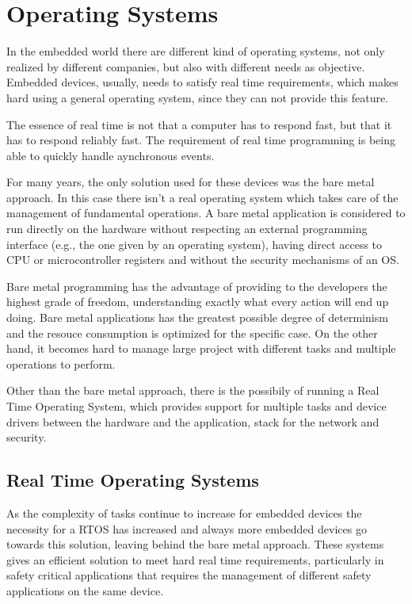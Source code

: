 \section{Operating Systems}

In the embedded world there are different kind of operating systems, not only
realized by different companies, but also with different needs as objective.
Embedded devices, usually, needs to satisfy real time requirements, which
makes hard using a general operating system, since they can not provide
this feature.

The essence of real time is not that a computer has to respond fast, but that
it has to respond reliably fast.
The requirement of real time programming is being able to quickly handle
aynchronous events. \cite{abbott2011linux} 

For many years, the only solution used for these devices was the bare metal
approach. In this case there isn't a real operating system which takes care
of the management of fundamental operations.
A bare metal application is considered to run directly on the hardware without
respecting an external programming interface 
(e.g., the one given by an operating system), having direct access to CPU
or microcontroller registers and without the security mechanisms of an OS.

Bare metal programming has the advantage of providing to the developers the
highest grade of freedom, understanding exactly what every action will end up
doing. Bare metal applications has the greatest possible degree of 
determinism and the resouce consumption is optimized for the specific case. 
On the other hand, it becomes hard to manage large project with different tasks
and multiple operations to perform.

Other than the bare metal approach, there is the possibily of running a Real
Time Operating System, which provides support for multiple tasks and
device drivers between the hardware and the application, stack for the network
and security.

\subsection{Real Time Operating Systems}

As the complexity of tasks continue to increase for embedded devices the
necessity for a RTOS has increased and always more embedded devices go towards
this solution, leaving behind the bare metal approach.
These systems gives an efficient solution to meet hard real time requirements,
particularly in safety critical applications that requires the management of
different safety applications on the same device.

